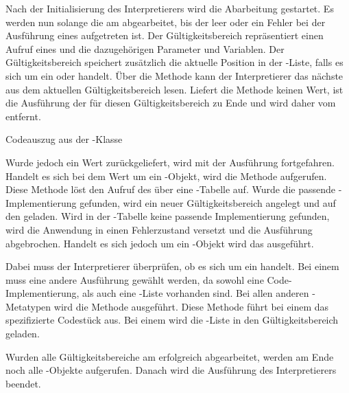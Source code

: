 \SuperPar
Nach der Initialisierung des Interpretierers wird die Abarbeitung gestartet. Es werden nun solange die  am  abgearbeitet, bis der  leer oder ein Fehler bei der Ausführung eines  aufgetreten ist. Der Gültigkeitsbereich repräsentiert einen Aufruf eines  und die dazugehörigen Parameter und Variablen. Der Gültigkeitsbereich speichert zusätzlich die aktuelle Position in der -Liste, falls es sich um ein  oder  handelt. Über die Methode  kann der Interpretierer das nächste  aus dem aktuellen Gültigkeitsbereich lesen. Liefert die Methode keinen Wert, ist die Ausführung der  für diesen Gültigkeitsbereich zu Ende und wird daher vom  entfernt.

\begin{program}

\caption{Codeauszug aus der -Klasse}
\label{prog:runtime}
\end{program}

\SuperPar
Wurde jedoch ein Wert zurückgeliefert, wird mit der Ausführung fortgefahren. Handelt es sich bei dem Wert um ein -Objekt, wird die Methode  aufgerufen. Diese Methode löst den Aufruf des  über eine -Tabelle auf. Wurde die passende -Implementierung gefunden, wird ein neuer Gültigkeitsbereich angelegt und auf den  geladen. Wird in der -Tabelle keine passende Implementierung gefunden, wird die Anwendung in einen Fehlerzustand versetzt und die Ausführung abgebrochen. Handelt es sich jedoch um ein -Objekt wird das  ausgeführt.  

\SuperPar
Dabei muss der Interpretierer überprüfen, ob es sich um ein  handelt. Bei einem  muss eine andere Ausführung gewählt werden, da sowohl eine Code-Implementierung, als auch eine -Liste vorhanden sind. Bei allen anderen -Metatypen wird die Methode  ausgeführt. Diese Methode führt bei einem  das spezifizierte Codestück aus. Bei einem  wird die -Liste in den Gültigkeitsbereich geladen.

\SuperPar
Wurden alle Gültigkeitsbereiche am  erfolgreich abgearbeitet, werden am Ende noch alle -Objekte aufgerufen. Danach wird die Ausführung des Interpretierers beendet.

